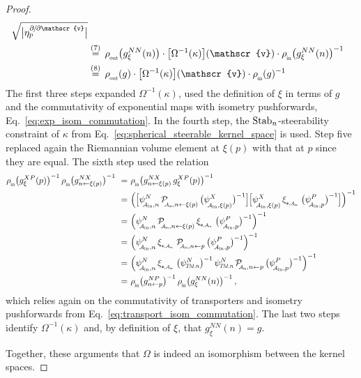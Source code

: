 \begin{proof}
\begin{align}
               \ \sqrt{\big|\eta_p^{\partial\mkern-2mu/\mkern-2mu\partial\mathscr{v}}\big|} \notag \\
        \,&\overset{(7)}{=}\, \rhoout\big( g_\xi^{NN}(n) \big) \cdot \big[\Omega^{-1}(\kappa)\big](\mathscr{v}) \cdot \rhoin\big( g_\xi^{NN}(n) \big)^{-1} \notag \\
        \,&\overset{(8)}{=}\, \rhoout(g) \cdot \big[\Omega^{-1}(\kappa)\big](\mathscr{v}) \cdot \rhoin(g)^{-1}
    \end{align}
    The first three steps expanded $\Omega^{-1}(\kappa)$, used the definition of $\xi$ in terms of $g$ and the commutativity of exponential maps with isometry pushforwards, Eq.~\eqref{eq:exp_isom_commutation}.
    In the fourth step, the $\operatorname{Stab}_{n}$-steerability constraint of $\kappa$ from Eq.~\eqref{eq:spherical_steerable_kernel_space} is used.
    Step five replaced again the Riemannian volume element at $\xi(p)$ with that at $p$ since they are equal.
    The sixth step used the relation
    \begin{align}
        \rhoin\big( g_\xi^{XP}(p) \big)^{-1}\, \rhoin\big( g_{n\leftarrow\xi(p)}^{NX} \big)^{-1}
        \ =&\ \rhoin\big( g_{n\leftarrow\xi(p)}^{NX}\, g_\xi^{XP}(p) \big)^{-1} \notag \\
        \ =&\ \Big( \pig[ \psiAinn^N\, \PAinnxip\, \big(\psiAinxip^X \big)^{-1} \pig] \pig[ \psiAinxip^X\, \dxiAin\, \big(\psiAinp^P \big)^{-1} \pig] \Big)^{-1} \notag \\
        \ =&\ \Big( \psiAinn^N\, \PAinnxip\, \dxiAin\, \big(\psiAinp^P \big)^{-1} \Big)^{-1} \notag \\
        \ =&\ \Big( \psiAinn^N\, \dxiAin\, \PAinnp\, \big(\psiAinp^P \big)^{-1} \Big)^{-1} \notag \\
        \ =&\ \Big( \psiAinn^N\, \dxiAin\, \big(\psiTMn^N\big)^{-1}\, \psiTMn^N\, \PAinnp\, \big(\psiAinp^P \big)^{-1} \Big)^{-1} \notag \\
        \ =&\ \rhoin\big( g_{n\leftarrow p}^{NP} \big)^{-1}\, \rhoin\big( g_\xi^{NN}(n) \big)^{-1} \,,
    \end{align}
    which relies again on the commutativity of transporters and isometry pushforwards from Eq.~\eqref{eq:transport_isom_commutation}.
    The last two steps identify $\Omega^{-1}(\kappa)$ and, by definition of $\xi$, that $g_\xi^{NN}(n) = g$.

    Together, these arguments that $\Omega$ is indeed an isomorphism between the kernel spaces.
\end{proof}








